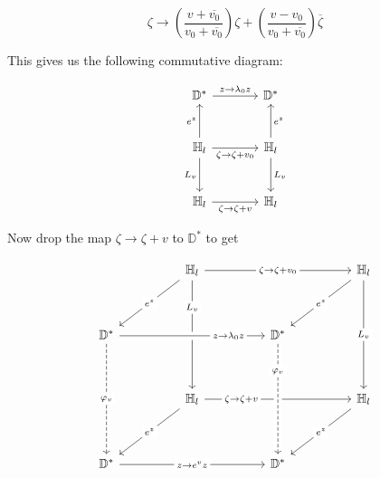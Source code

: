 \documentclass[11pt,a4paper]{article}
\begin{document}
        $$\zeta \rightarrow \left(\frac{v+\overline{v_0}}{v_0 + \overline{v_0}}\right)\zeta + \left(\frac{v-v_0}{v_0 + \overline{v_0}}\right)\overline{\zeta}$$


        This gives us the following commutative diagram:

        $$\begin{tikzcd}[column sep = large, row sep = large]
        \mathbb{D}^*
        \arrow[r, "z\rightarrow \lambda_0z"]
        &
        \mathbb{D}^*
        \\
        \mathbb{H}_l
        \arrow[u, "e^z"]
        \arrow[r, "\zeta \rightarrow \zeta + v_0"']
        \arrow[d, "L_v"']
        &
        \mathbb{H}_l
        \arrow[d, "L_v"]
        \arrow[u, "e^z"']
        \\
        \mathbb{H}_l
        \arrow[r, "\zeta \rightarrow \zeta + v"']
        &
        \mathbb{H}_l
        \end{tikzcd}$$



        Now drop the map $\zeta \rightarrow \zeta + v$ to $\mathbb{D}^*$ to get



        $$\begin{tikzcd}[row sep=huge, column sep=huge]
        & \mathbb{H}_l \arrow[dl, "e^z" description] \arrow[rr, "\zeta \rightarrow \zeta + v_0" description] \arrow[dd, near start, "L_v" description] & & \mathbb{H}_l \arrow[dl, "e^z" description] \arrow[dd, "L_v" description] \\
        \mathbb{D}^* \arrow[rr, crossing over, near end, "z\rightarrow \lambda_0z" description] \arrow[dd, dashed, "\phi_v" description] & & \mathbb{D}^* \\
        & \mathbb{H}_l \arrow[dl, "e^z" description] \arrow[rr, near start, "\zeta \rightarrow \zeta + v" description] & & \mathbb{H}_l \arrow[dl, "e^z" description] \\
        \mathbb{D}^* \arrow[rr, "z \rightarrow e^vz" description] & & \mathbb{D}^* \arrow[from=uu, crossing over, near start, dashed, "\phi_v" description]
        \end{tikzcd}$$

\end{document}
